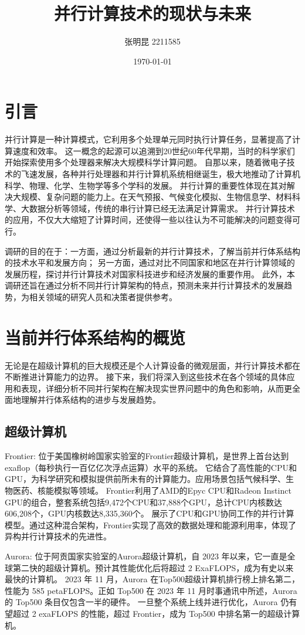 \documentclass{ctexart}
\title{并行计算技术的现状与未来}
\author{张明昆 2211585}
\date{\today}
\begin{document}
\maketitle
\tableofcontents
\section{引言}
并行计算是一种计算模式，它利用多个处理单元同时执行计算任务，显著提高了计算速度和效率。
这一概念的起源可以追溯到20世纪60年代早期，当时的科学家们开始探索使用多个处理器来解决大规模科学计算问题。
自那以来，随着微电子技术的飞速发展，各种并行处理器和并行计算机系统相继诞生，极大地推动了计算机科学、物理、化学、生物学等多个学科的发展。
并行计算的重要性体现在其对解决大规模、复杂问题的能力上。在天气预报、气候变化模拟、生物信息学、材料科学、大数据分析等领域，传统的串行计算已经无法满足计算需求。
并行计算技术的应用，不仅大大缩短了计算时间，还使得一些以往认为不可能解决的问题变得可行。

调研的目的在于：一方面，通过分析最新的并行计算技术，了解当前并行体系结构的技术水平和发展方向；
另一方面，通过对比不同国家和地区在并行计算领域的发展历程，探讨并行计算技术对国家科技进步和经济发展的重要作用。
此外，本调研还旨在通过分析不同并行计算架构的特点，预测未来并行计算技术的发展趋势，为相关领域的研究人员和决策者提供参考。
\section{当前并行体系结构的概览}
无论是在超级计算机的巨大规模还是个人计算设备的微观层面，并行计算技术都在不断推进计算能力的边界。
接下来，我们将深入到这些技术在各个领域的具体应用和表现，详细分析不同并行架构在解决现实世界问题中的角色和影响，从而更全面地理解并行体系结构的进步与发展趋势。
\subsection{超级计算机}
Frontier: 位于美国橡树岭国家实验室的Frontier超级计算机，是世界上首台达到exaflop（每秒执行一百亿亿次浮点运算）水平的系统。\cite{wells2018powering} \cite{dabbar2020exascale}
它结合了高性能的CPU和GPU，为科学研究和模拟提供前所未有的计算能力。应用场景包括气候科学、生物医药、核能模拟等领域。
Frontier利用了AMD的Epyc CPU和Radeon Instinct GPU的组合，整套系统包括9,472个CPU和37,888个GPU，总计CPU内核数达606,208个，GPU内核数达8,335,360个。 \cite{choi2022beating}
展示了CPU和GPU协同工作的并行计算模型。通过这种混合架构，Frontier实现了高效的数据处理和能源利用率，体现了异构并行计算技术的先进性。

Aurora: 位于阿贡国家实验室的Aurora超级计算机，自 2023 年以来，它一直是全球第二快的超级计算机。预计其性能优化后将超过 2 ExaFLOPS，成为有史以来最快的计算机。\cite{intel2023datacenter}
2023 年 11 月，Aurora 在Top500超级计算机排行榜上排名第二，性能为 585 petaFLOPS。正如 Top500 在 2023 年 11 月时事通讯中所述，Aurora 的 Top500 条目仅包含一半的硬件。
一旦整个系统上线并进行优化，Aurora 仍有望超过 2 exaFLOPS 的性能，超过 Frontier，成为 Top500 中排名第一的超级计算机。 \cite{shilov2023aurora} \cite{top500aurora}
\end{document}
